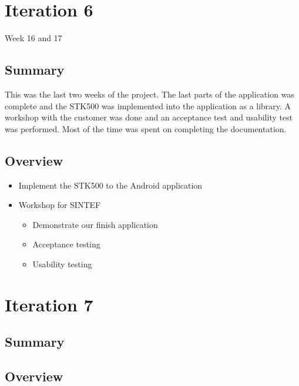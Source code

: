 \section{Iteration 6}
Week 16 and 17

\subsection{Summary}
	This was the last two weeks of the project. The last parts of the application was complete and the STK500 was implemented into the application as a library.
	A workshop with the customer was done and an acceptance test and usability test was performed. Most of the time was spent on completing the documentation.

\subsection{Overview}
\begin{itemize}
	\item{Implement the STK500 to the Android application}
	\item{Workshop for SINTEF}
		\begin{itemize}
		\item{Demonstrate our finish application}
		\item{Acceptance testing}
		\item{Usability testing}
	\end{itemize}
\end{itemize}

\section{Iteration 7}

\subsection{Summary}

\subsection{Overview}
